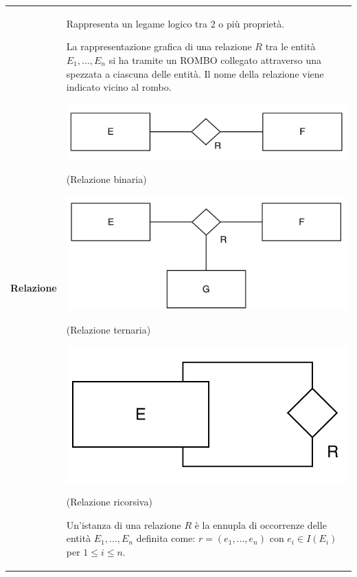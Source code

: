 \documentclass[a4paper, 10pt]{report}
\begin{document}
\begin{longtable}{| p{} | p{} |}
\textbf{Relazione} & Rappresenta un legame logico tra 2 o più proprietà.

La rappresentazione grafica di una relazione $R$ tra le entità $E_1,..., E_n$ si ha tramite un ROMBO collegato attraverso una spezzata a ciascuna delle entità. Il nome della relazione viene indicato vicino al rombo.

\begin{center}
\includegraphics[scale=0.35]{img4.pdf}

(Relazione binaria)

\includegraphics[scale=0.35]{immagine5.pdf}

(Relazione ternaria)

\includegraphics[scale=0.35]{immagine6.pdf}

(Relazione ricorsiva)
\end{center}

Un'istanza di una relazione $R$ è la ennupla di occorrenze delle entità $E_1,..., E_n$ definita come: $r = (e_1,..., e_n)$ con $e_i \in I(E_i)$ per $1 \le i \le n$.
\end{longtable}
\end{document}
